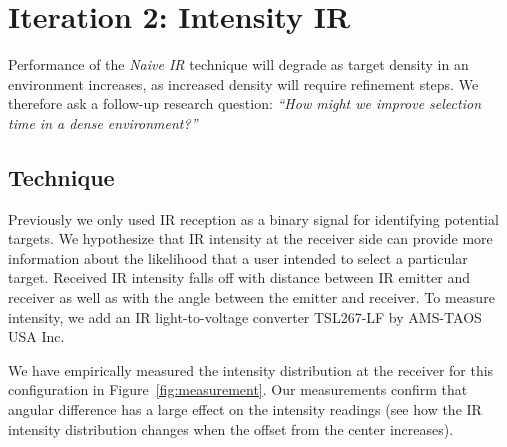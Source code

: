 
\section{Iteration 2: Intensity IR}


Performance of the {\em Naive IR} technique will degrade as target density in an environment increases, as increased density will require refinement steps. We therefore ask a follow-up research question: {\em``How might we improve selection time in a dense environment?''}

\subsection{Technique}
Previously we only used IR reception as a binary signal for identifying potential targets. We hypothesize that IR intensity at the receiver side can provide more information about the likelihood that a user intended to select a particular target. Received IR intensity falls off with distance between IR emitter and receiver as well as with the angle between the emitter and receiver. To measure intensity, we add an IR light-to-voltage converter TSL267-LF by AMS-TAOS USA Inc.


We have empirically measured the intensity distribution at the receiver for this configuration in Figure~\ref{fig:measurement}. Our measurements confirm that angular difference has a large effect on the intensity readings (see how the IR intensity distribution changes when the offset from the center increases).

